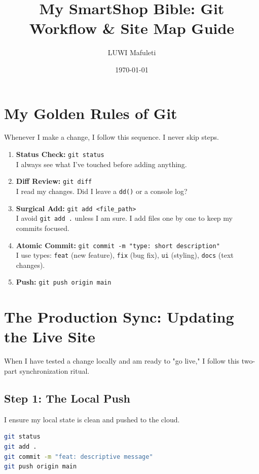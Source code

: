 \documentclass[12pt,a4paper]{article}
\title{\textbf{My SmartShop Bible: Git Workflow \& Site Map Guide}}
\author{LUWI Mafuleti}
\date{\today}
\begin{document}
\maketitle
\tableofcontents
\newpage

\section{My Golden Rules of Git}
Whenever I make a change, I follow this sequence. I never skip steps.

\begin{enumerate}
    \item \textbf{Status Check:} \texttt{git status} \\
    I always see what I've touched before adding anything.
    \item \textbf{Diff Review:} \texttt{git diff} \\
    I read my changes. Did I leave a \texttt{dd()} or a console log?
    \item \textbf{Surgical Add:} \texttt{git add <file\_path>} \\
    I avoid \texttt{git add .} unless I am sure. I add files one by one to keep my commits focused.
    \item \textbf{Atomic Commit:} \texttt{git commit -m "type: short description"} \\
    I use types: \texttt{feat} (new feature), \texttt{fix} (bug fix), \texttt{ui} (styling), \texttt{docs} (text changes).
    \item \textbf{Push:} \texttt{git push origin main}
\end{enumerate}

\section{The Production Sync: Updating the Live Site}
When I have tested a change locally and am ready to "go live," I follow this two-part synchronization ritual.

\subsection{Step 1: The Local Push}
I ensure my local state is clean and pushed to the cloud.
\begin{lstlisting}[language=bash]
git status
git add .
git commit -m "feat: descriptive message"
git push origin main
\end{lstlisting}
\end{document}
